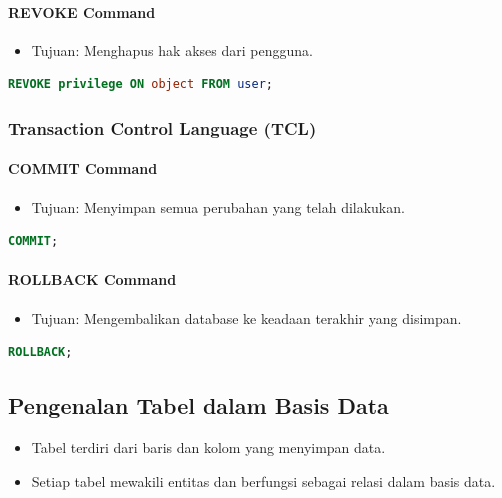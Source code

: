 \documentclass{article}
\begin{document}
\paragraph{REVOKE Command}
\begin{itemize}
    \item Tujuan: Menghapus hak akses dari pengguna.
\end{itemize}
\begin{lstlisting}[language=SQL, caption={Sintaks REVOKE Command}, captionpos=b]
REVOKE privilege ON object FROM user;
\end{lstlisting}

\subsubsection{Transaction Control Language (TCL)}
\paragraph{COMMIT Command}
\begin{itemize}
    \item Tujuan: Menyimpan semua perubahan yang telah dilakukan.
\end{itemize}
\begin{lstlisting}[language=SQL, caption={Sintaks COMMIT Command}, captionpos=b]
COMMIT;
\end{lstlisting}
\paragraph{ROLLBACK Command}
\begin{itemize}
    \item Tujuan: Mengembalikan database ke keadaan terakhir yang disimpan.
\end{itemize}
\begin{lstlisting}[language=SQL, caption={Sintaks ROLLBACK Command}, captionpos=b]
ROLLBACK;
\end{lstlisting}

\subsection{Pengenalan Tabel dalam Basis Data}
\begin{itemize}
    \item Tabel terdiri dari baris dan kolom yang menyimpan data.
    \item Setiap tabel mewakili entitas dan berfungsi sebagai relasi dalam basis data.
\end{itemize}
\end{document}
